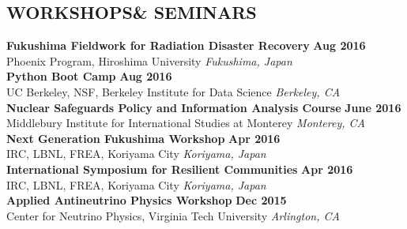 \documentclass[margin, 10pt]{style/res} %
\begin{document}
\begin{resume}





\section{\small{WORKSHOPS\newline \& SEMINARS}}


{\bf Fukushima Fieldwork for Radiation Disaster Recovery} \hfill {\bf Aug 2016}\\
{\small{Phoenix Program, Hiroshima University}} \hfill {\sl Fukushima, Japan}\\[-3.5ex]

{\bf Python Boot Camp} \hfill {\bf Aug 2016}\\
{\small{UC Berkeley, NSF, Berkeley Institute for Data Science}} \hfill {\sl Berkeley, CA}\\[-3.5ex]

{\bf Nuclear Safeguards Policy and Information Analysis Course} \hfill {\bf June 2016}\\
{\small{Middlebury Institute for International Studies at Monterey}} \hfill {\sl Monterey, CA}\\[-3.5ex]

{\bf Next Generation Fukushima Workshop} \hfill {\bf Apr 2016}\\
{\small{IRC, LBNL, FREA, Koriyama City}} \hfill {\sl Koriyama, Japan}\\[-3.5ex]

 \newpage
{\bf International Symposium for Resilient Communities} \hfill {\bf Apr 2016}\\
{\small{IRC, LBNL, FREA, Koriyama City}} \hfill {\sl Koriyama, Japan}\\[-3.5ex]

{\bf Applied Antineutrino Physics Workshop} \hfill {\bf Dec 2015}\\
{\small{Center for Neutrino Physics, Virginia Tech University}} \hfill {\sl Arlington, CA}\\[-3.5ex]


\end{resume}
\end{document}
